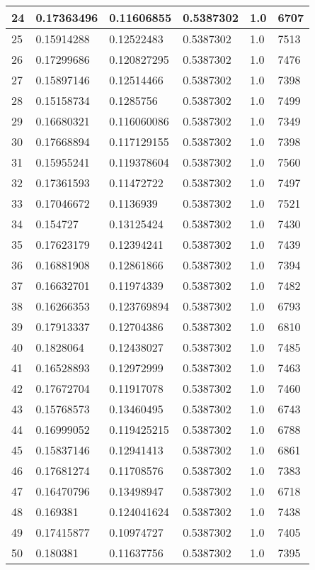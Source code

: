\begin{longtable}{|l|l|l|l|l|l|}
24 & 0.17363496 & 0.11606855 & 0.5387302 & 1.0 & 6707 \\ \hline 
25 & 0.15914288 & 0.12522483 & 0.5387302 & 1.0 & 7513 \\ \hline 
26 & 0.17299686 & 0.120827295 & 0.5387302 & 1.0 & 7476 \\ \hline 
27 & 0.15897146 & 0.12514466 & 0.5387302 & 1.0 & 7398 \\ \hline 
28 & 0.15158734 & 0.1285756 & 0.5387302 & 1.0 & 7499 \\ \hline 
29 & 0.16680321 & 0.116060086 & 0.5387302 & 1.0 & 7349 \\ \hline 
30 & 0.17668894 & 0.117129155 & 0.5387302 & 1.0 & 7398 \\ \hline 
31 & 0.15955241 & 0.119378604 & 0.5387302 & 1.0 & 7560 \\ \hline 
32 & 0.17361593 & 0.11472722 & 0.5387302 & 1.0 & 7497 \\ \hline 
33 & 0.17046672 & 0.1136939 & 0.5387302 & 1.0 & 7521 \\ \hline 
34 & 0.154727 & 0.13125424 & 0.5387302 & 1.0 & 7430 \\ \hline 
35 & 0.17623179 & 0.12394241 & 0.5387302 & 1.0 & 7439 \\ \hline 
36 & 0.16881908 & 0.12861866 & 0.5387302 & 1.0 & 7394 \\ \hline 
37 & 0.16632701 & 0.11974339 & 0.5387302 & 1.0 & 7482 \\ \hline 
38 & 0.16266353 & 0.123769894 & 0.5387302 & 1.0 & 6793 \\ \hline 
39 & 0.17913337 & 0.12704386 & 0.5387302 & 1.0 & 6810 \\ \hline 
40 & 0.1828064 & 0.12438027 & 0.5387302 & 1.0 & 7485 \\ \hline 
41 & 0.16528893 & 0.12972999 & 0.5387302 & 1.0 & 7463 \\ \hline 
42 & 0.17672704 & 0.11917078 & 0.5387302 & 1.0 & 7460 \\ \hline 
43 & 0.15768573 & 0.13460495 & 0.5387302 & 1.0 & 6743 \\ \hline 
44 & 0.16999052 & 0.119425215 & 0.5387302 & 1.0 & 6788 \\ \hline 
45 & 0.15837146 & 0.12941413 & 0.5387302 & 1.0 & 6861 \\ \hline 
46 & 0.17681274 & 0.11708576 & 0.5387302 & 1.0 & 7383 \\ \hline 
47 & 0.16470796 & 0.13498947 & 0.5387302 & 1.0 & 6718 \\ \hline 
48 & 0.169381 & 0.124041624 & 0.5387302 & 1.0 & 7438 \\ \hline 
49 & 0.17415877 & 0.10974727 & 0.5387302 & 1.0 & 7405 \\ \hline 
50 & 0.180381 & 0.11637756 & 0.5387302 & 1.0 & 7395 \\ \hline 
\end{longtable}